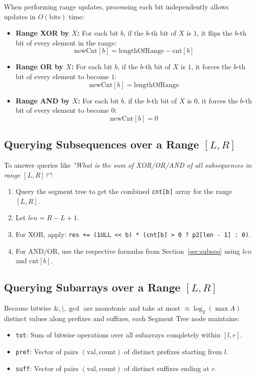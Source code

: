 \documentclass[10pt]{article}
\begin{document}
When performing range updates, processing each bit independently allows updates in $O(\text{bits})$ time:
\begin{itemize}
    \item \textbf{Range XOR by $X$:} 
    For each bit $b$, if the $b$-th bit of $X$ is $1$, it flips the $b$-th bit of every element in the range:
    \[ \text{newCnt}[b] = \text{lengthOfRange} - \text{cnt}[b] \]
    
    \item \textbf{Range OR by $X$:}
    For each bit $b$, if the $b$-th bit of $X$ is $1$, it forces the $b$-th bit of every element to become $1$:
    \[ \text{newCnt}[b] = \text{lengthOfRange} \]
    
    \item \textbf{Range AND by $X$:}
    For each bit $b$, if the $b$-th bit of $X$ is $0$, it forces the $b$-th bit of every element to become $0$:
    \[ \text{newCnt}[b] = 0 \]
\end{itemize}

\subsection{Querying Subsequences over a Range \texorpdfstring{$[L, R]$}{[L, R]}}

To answer queries like \textit{"What is the sum of XOR/OR/AND of all subsequences in range $[L, R]$?"}:
\begin{enumerate}
    \item Query the segment tree to get the combined \texttt{cnt[b]} array for the range $[L, R]$.
    \item Let $len = R - L + 1$.
    \item For XOR, apply: \texttt{res += (1ULL <{}< b) * (cnt[b] > 0 ? p2[len - 1] : 0)}.
    \item For AND/OR, use the respective formulas from Section~\ref{sec:subseq} using $len$ and $\text{cnt}[b]$.
\end{enumerate}

\subsection{Querying Subarrays over a Range \texorpdfstring{$[L, R]$}{[L, R]}}

Because bitwise $\&, |, \gcd$ are monotonic and take at most $\approx \log_2(\max A)$ distinct values along prefixes and suffixes, each Segment Tree node maintains:
\begin{itemize}
    \item \texttt{tot}: Sum of bitwise operations over all subarrays completely within $[l, r]$.
    \item \texttt{pref}: Vector of pairs $(\text{val}, \text{count})$ of distinct prefixes starting from $l$.
    \item \texttt{suff}: Vector of pairs $(\text{val}, \text{count})$ of distinct suffixes ending at $r$.
\end{itemize}
\end{document}

